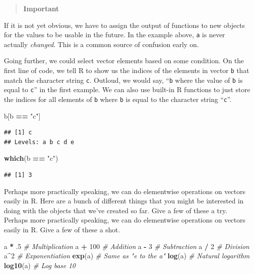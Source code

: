 \documentclass[
]{book}
\newenvironment{Shaded}{\begin{snugshade}}{\end{snugshade}}
\newcommand{\CommentTok}[1]{\textcolor[rgb]{0.56,0.35,0.01}{\textit{#1}}}
\newcommand{\DecValTok}[1]{\textcolor[rgb]{0.00,0.00,0.81}{#1}}
\newcommand{\FloatTok}[1]{\textcolor[rgb]{0.00,0.00,0.81}{#1}}
\newcommand{\KeywordTok}[1]{\textcolor[rgb]{0.13,0.29,0.53}{\textbf{#1}}}
\newcommand{\NormalTok}[1]{#1}
\newcommand{\OperatorTok}[1]{\textcolor[rgb]{0.81,0.36,0.00}{\textbf{#1}}}
\newcommand{\StringTok}[1]{\textcolor[rgb]{0.31,0.60,0.02}{#1}}
\begin{document}
\begin{quote}
\textbf{Important}
\end{quote}

If it is not yet obvious, we have to assign the output of functions to new objects for the values to be usable in the future. In the example above, \texttt{a} is never actually \emph{changed}. This is a common source of confusion early on.

Going further, we could select vector elements based on some condition. On the first line of code, we tell R to show us the indices of the elements in vector \texttt{b} that match the character string \texttt{c}. Outloud, we would say, ``\texttt{b} where the value of \texttt{b} is equal to \texttt{c}'' in the first example. We can also use built-in R functions to just store the indices for all elements of \texttt{b} where \texttt{b} is equal to the character string ``\texttt{c}''.

\begin{Shaded}
\begin{Highlighting}[]
\NormalTok{b[b }\OperatorTok{==}\StringTok{ "c"}\NormalTok{]}
\end{Highlighting}
\end{Shaded}

\begin{verbatim}
## [1] c
## Levels: a b c d e
\end{verbatim}

\begin{Shaded}
\begin{Highlighting}[]
\KeywordTok{which}\NormalTok{(b }\OperatorTok{==}\StringTok{ "c"}\NormalTok{)}
\end{Highlighting}
\end{Shaded}

\begin{verbatim}
## [1] 3
\end{verbatim}

Perhaps more practically speaking, we can do elementwise operations on vectors easily in R. Here are a bunch of different things that you might be interested in doing with the objects that we've created so far. Give a few of these a try.
Perhaps more practically speaking, we can do elementwise operations on vectors easily in R. Give a few of these a shot.

\begin{Shaded}
\begin{Highlighting}[]
\NormalTok{a }\OperatorTok{*}\StringTok{ }\FloatTok{.5} \CommentTok{# Multiplication}
\NormalTok{a }\OperatorTok{+}\StringTok{ }\DecValTok{100} \CommentTok{# Addition}
\NormalTok{a }\OperatorTok{-}\StringTok{ }\DecValTok{3} \CommentTok{# Subtraction}
\NormalTok{a }\OperatorTok{/}\StringTok{ }\DecValTok{2} \CommentTok{# Division}
\NormalTok{a}\OperatorTok{^}\DecValTok{2} \CommentTok{# Exponentiation}
\KeywordTok{exp}\NormalTok{(a) }\CommentTok{# Same as "e to the a"}
\KeywordTok{log}\NormalTok{(a) }\CommentTok{# Natural logarithm}
\KeywordTok{log10}\NormalTok{(a) }\CommentTok{# Log base 10}
\end{Highlighting}
\end{Shaded}
\end{document}
